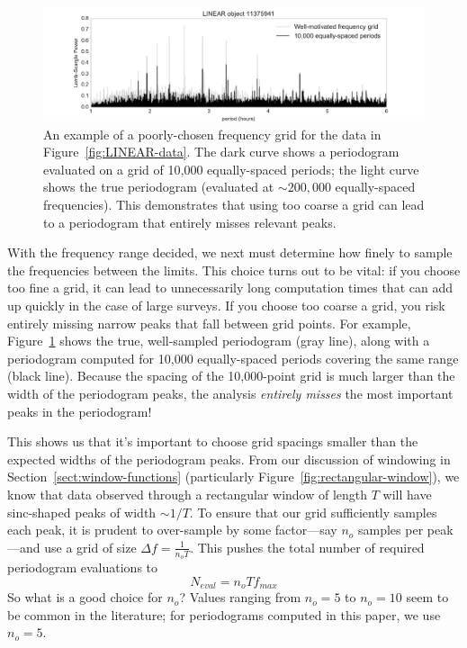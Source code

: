 \documentclass[preprint]{aastex}
\newcommand{\fig}[1]{Figure~\ref{fig:#1}}
\newcommand{\figlabel}[1]{\label{fig:#1}}
\newcommand{\eqlabel}[1]{\label{eq:#1}}
\newcommand{\Sect}[1]{Section~\ref{sect:#1}}
\newcommand{\sect}[1]{\Sect{#1}}
\begin{document}
\begin{figure}[ht]
  \centering
  \includegraphics[width=\textwidth]{fig19_LINEAR_coarse_grid}
  \caption{An example of a poorly-chosen frequency grid for the data in
    \fig{LINEAR-data}. The dark curve shows a periodogram evaluated on a
    grid of 10,000 equally-spaced periods; the light curve shows the true
    periodogram (evaluated at ${\sim}200,000$ equally-spaced frequencies).
    This demonstrates that using too coarse a grid can lead to a periodogram
    that entirely misses relevant peaks.
    \figlabel{LINEAR-coarse-grid}}
\end{figure}

With the frequency range decided, we next must determine how finely to sample
the frequencies between the limits.
This choice turns out to be vital: if you choose too fine a grid, it can
lead to unnecessarily long computation times that can add up quickly in the
case of large surveys. If you choose too coarse a grid, you
risk entirely missing narrow peaks that fall between grid points.
For example, \fig{LINEAR-coarse-grid} shows the true, well-sampled periodogram
(gray line), along with a periodogram computed for 10,000 equally-spaced
periods covering the same range (black line).
Because the spacing of the 10,000-point grid is much larger than the width of
the periodogram peaks, the analysis {\it entirely misses} the most
important peaks in the periodogram!

This shows us that it's important to choose grid spacings smaller than the
expected widths of the periodogram peaks.
From our discussion of windowing in \sect{window-functions}
(particularly \fig{rectangular-window}), we know that data observed through a
rectangular window of length $T$ will have sinc-shaped peaks of width
${\sim}1/T$.
To ensure that our grid sufficiently samples each peak, it is prudent to
over-sample by some factor---say $n_o$ samples per peak---and
use a grid of size $\Delta f = \frac{1}{n_o T}$.
This pushes the total number of required periodogram evaluations to
\begin{equation}
  \eqlabel{n-eval}
  N_{eval} = n_o T f_{max}
\end{equation}
So what is a good choice for $n_o$?
Values ranging from $n_o=5$ \citep{Schwarzenberg-Czerny96, VanderPlas2015}
to $n_o=10$ \citep{Desbosscher07, Richards12}
seem to be common in the literature;
for periodograms computed in this paper, we use $n_o=5$.
\end{document}
